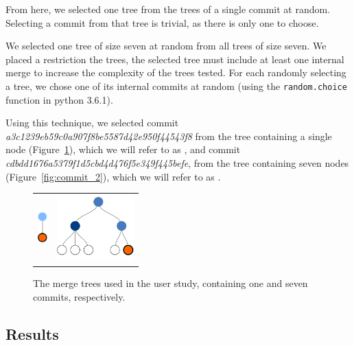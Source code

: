 \documentclass[draft]{IEEEtran}
\begin{document}
From here, we selected one tree from the trees of a single commit at
random. Selecting a commit from that tree is trivial, as there is only
one to choose.

We selected one tree of size seven at random from all trees of size
seven. We placed a restriction the trees, the selected tree must include
at least one internal merge to increase the complexity of the trees
tested. For each randomly selecting a tree, we chose one of its internal commits at
random (using the \verb|random.choice| function in python 3.6.1).


Using this technique, we selected commit
\emph{a3c1239eb59c0a907f8be5587d42e950f44543f8} from the tree containing
a single node (Figure~\ref{fig:commit_1}), which we will refer to as
\comA, and commit \emph{cdbdd1676a5379f1d5cbd4d476f5e349f445befe}, from
the tree containing seven nodes (Figure~\ref{fig:commit_2}), which we
will refer to as \comB.

\begin{figure}[bpt]
  \centering
\begin{tabular}{ m{1.5cm} m{3cm} }
  \includegraphics[height=0.5in]{figures/commits/1-commit.pdf} &
  \includegraphics[height=1in]{figures/commits/7-commits.pdf}\\
\end{tabular}
  \caption{The merge trees used in the user study, 
    containing one and seven commits, respectively.}
  \label{fig:commit_1}
\end{figure}


\subsection{Results}
\label{sec:results}
\end{document}
